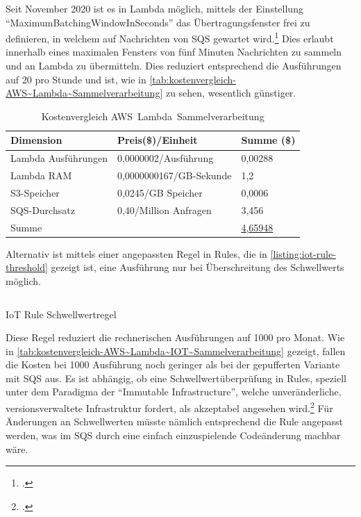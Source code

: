 Seit November 2020 ist es in Lambda möglich, mittels der Einstellung \enquote{MaximumBatchingWindowInSeconds} das Übertragungsfenster frei zu definieren, in welchem auf Nachrichten von \ac{SQS} gewartet wird.\footcite[Vgl. auch im Folgenden][]{AmazonWebServicesInc..2020b} Dies erlaubt innerhalb eines maximalen Fensters von fünf Minuten Nachrichten zu sammeln und an Lambda zu übermitteln. Dies reduziert entsprechend die Ausführungen auf 20 pro Stunde und ist, wie in \autoref{tab:kostenvergleich-AWS~Lambda~Sammelverarbeitung} zu sehen, wesentlich günstiger.

\begin{table}[H]
\centering
\begin{tabular}{|l|l|l|}
\hline
Dimension & Preis(\$)/Einheit & Summe (\$) \\ \hline
Lambda Ausführungen & 0,0000002/Ausführung & 0,00288 \\ \hline
Lambda \ac{RAM} & 0,0000000167/GB-Sekunde & 1,2 \\ \hline
\ac{S3}-Speicher & 0,0245/GB Speicher & 0,0006 \\ \hline
\ac{SQS}-Durchsatz & 0,40/Million Anfragen & 3,456 \\\hline
Summe & \cellcolor[HTML]{EFEFEF} & \underline{4,65948} \\ \hline
\end{tabular}
\caption{Kostenvergleich AWS~Lambda~Sammelverarbeitung}
\label{tab:kostenvergleich-AWS~Lambda~Sammelverarbeitung}
\end{table}


Alternativ ist mittels einer angepassten Regel in \AWSIOT{} Rules, die in \autoref{listing:iot-rule-threshold} gezeigt ist, eine Ausführung nur bei Überschreitung des Schwellwerts möglich.

\begin{listing}[H]
\inputminted[frame=lines,breaklines=true]{sql}{code/iot-rules-lambda-filter.sql}
\caption{IoT Rule Schwellwertregel}
\label{listing:iot-rule-threshold}
\end{listing}
Diese Regel reduziert die rechnerischen Ausführungen auf 1000 pro Monat. Wie in \autoref{tab:kostenvergleich-AWS~Lambda~IOT~Sammelverarbeitung} gezeigt, fallen die Kosten bei 1000 Ausführung noch geringer als bei der gepufferten Variante mit \ac{SQS} aus. Es ist abhängig, ob eine Schwellwertüberprüfung in \AWSIOT{} Rules, speziell unter dem Paradigma der \enquote{Immutable Infrastructure}, welche unveränderliche, versionsverwaltete Infrastruktur fordert, als akzeptabel angesehen wird.\footcite[Vgl.][]{AmazonWebServicesInc..o.J.p} Für Änderungen an Schwellwerten müsste nämlich entsprechend die \AWSIOT{} Rule angepasst werden, was im \ac{SQS} durch eine einfach einzuspielende Codeänderung machbar wäre.

